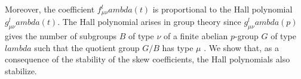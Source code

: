 \documentclass[12pt]{amsart}%
\def\lambda{lambda}%
\theoremstyle{remark}
\theoremstyle{definition}
\newcommand{\Q}{\mathbb{Q}}
\begin{document}
    Moreover, the coefficient $f_{\mu\nu}^\lambda(t)$ is proportional to the Hall polynomial $g_{\mu\nu}^\lambda(t)$. The Hall polynomial arises in group theory since $g_{\mu\nu}^\lambda(p)$ gives the number of subgroups $B$ of type $\nu$ of a finite abelian $p$-group $G$ of type $\lambda$ such that the quotient group $G/B$ has type $\mu$ \cite{morris:1962}. We show that, as a consequence of the stability of the skew coefficients, the Hall polynomials also stabilize.
    
    
    


    

\end{document}
